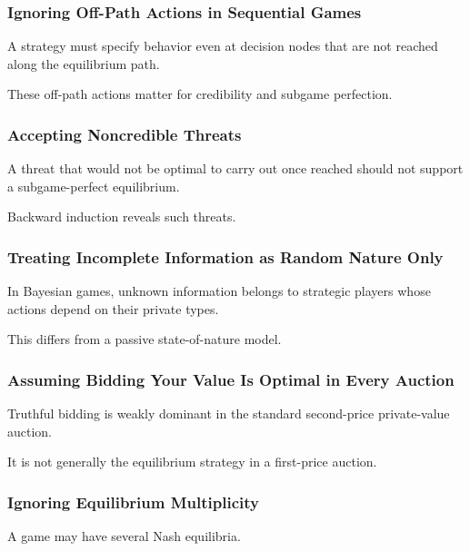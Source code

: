 \subsubsection{Ignoring Off-Path Actions in Sequential Games}

A strategy must specify behavior even at decision nodes that are not
reached along the equilibrium path.

These off-path actions matter for credibility and subgame perfection.

\subsubsection{Accepting Noncredible Threats}

A threat that would not be optimal to carry out once reached should not
support a subgame-perfect equilibrium.

Backward induction reveals such threats.

\subsubsection{Treating Incomplete Information as Random Nature Only}

In Bayesian games, unknown information belongs to strategic players whose
actions depend on their private types.

This differs from a passive state-of-nature model.

\subsubsection{Assuming Bidding Your Value Is Optimal in Every Auction}

Truthful bidding is weakly dominant in the standard second-price
private-value auction.

It is not generally the equilibrium strategy in a first-price auction.

\subsubsection{Ignoring Equilibrium Multiplicity}

A game may have several Nash equilibria.

